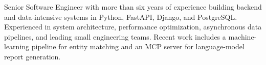 %
%
%

Senior Software Engineer with more than six years of experience building backend and
data-intensive systems in Python, FastAPI, Django, and PostgreSQL. Experienced in system
architecture, performance optimization, asynchronous data pipelines, and leading small
engineering teams. Recent work includes a machine-learning pipeline for entity matching
and an MCP server for language-model report generation.

